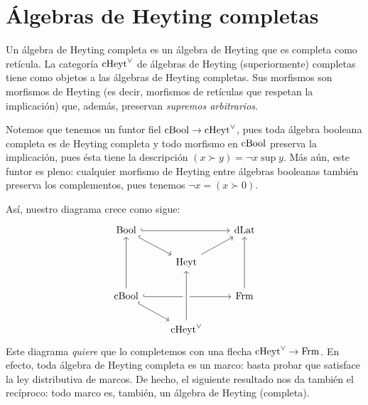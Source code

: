 \section{Álgebras de Heyting completas}

\begin{defn}
  Un álgebra de Heyting completa es un álgebra de Heyting que es
  completa como retícula.
  La categoría $\mathrm{cHeyt}^\vee$ de álgebras de Heyting (superiormente)
  completas tiene como objetos a las álgebras de Heyting completas.
  Sus morfismos son morfismos de Heyting (es decir, morfismos de
  retículas que respetan la implicación) que, además, preservan
  \emph{supremos arbitrarios}.
\end{defn}

Notemos que tenemos un funtor fiel $\mathrm{cBool}\to\mathrm{cHeyt}^\vee$, pues toda
álgebra booleana completa es de Heyting completa y todo
morfismo en $\mathrm{cBool}$ preserva la implicación, pues ésta tiene la
descripción $(x\succ y)=\neg x\sup y$.
Más aún, este funtor es pleno: cualquier morfismo de Heyting
entre álgebras booleanas también preserva los complementos, pues
tenemos $\neg x = (x\succ 0)$.

Así, nuestro diagrama crece como sigue:
\begin{equation}\label{diag:prisma-cheyt-incompleto}
\begin{tikzcd}
  \Bool \ar[dr,hook] \ar[rr,hook] &               & \DLat \\
                                  & \Heyt \ar[ur]         \\
  \CBA \ar[uu] \ar[rr,hook] \ar[dr,hook] & & \Frm \ar[uu]    \\
                            & \cHeyt \ar[uu,crossing over]
\end{tikzcd}
\end{equation}
Este diagrama \emph{quiere} que lo completemos con una flecha
$\mathrm{cHeyt}^\vee\to\mathrm{Frm}$. En efecto, toda álgebra de Heyting completa es un
marco: basta probar que satisface la ley distributiva de marcos. De
hecho, el siguiente resultado nos da también el recíproco: todo marco
es, también, un álgebra de Heyting (completa).

